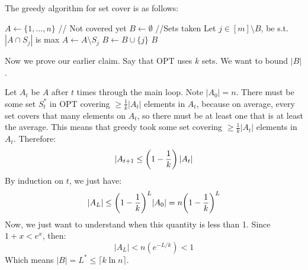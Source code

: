 The greedy algorithm for set cover is as follows:
\begin{algothm}
    \begin{algorithmic}
            \State $A \gets \{ 1, \dots, n \}$ // Not covered yet
            \State $B \gets \emptyset$ //Sets taken
                \State Let $j \in [m]\setminus B$, be s.t. $|A \cap S_j|$ is max
                \State $A \gets A \setminus S_j$
                \State $B \gets B \cup \{j\}$
            \EndWhile
            \State \Return $B$
        \EndFunction
    \end{algorithmic}

    Now we prove our earlier claim. Say that OPT uses $k$ sets. We want to bound $|B|$.
    \begin{proof*}
        Let $A_t$ be $A$ after $t$ times through the main loop. Note $|A_0| = n$.
        There must be some set $S^*_t$ in OPT covering $\geq \frac{1}{k} |A_t|$ elements in $A_t$, because on
        average, every set covers that many elements on $A_t$, so there must be at least one that is at least the average.
        This means that greedy took some set covering $\geq \frac{1}{k} |A_t|$ elements in $A_t$.
        Therefore:
        \[ |A_{t + 1} \leq \qty(1 - \frac{1}{k}) |A_t| \]
        By induction on $t$, we just have:
        \[ |A_L| \leq \qty(1 - \frac{1}{k})^L |A_0| = n \qty(1 - \frac{1}{k})^L \]
        Now, we just want to understand when this quantity is less than 1. Since $1 + x < e^x$,
        then:
        \[ |A_L| < n(e^{-L/k}) < 1 \]
        Which means $|B| = L^* \leq \lceil k \ln n \rceil$.
    \end{proof*}
\end{algothm}
